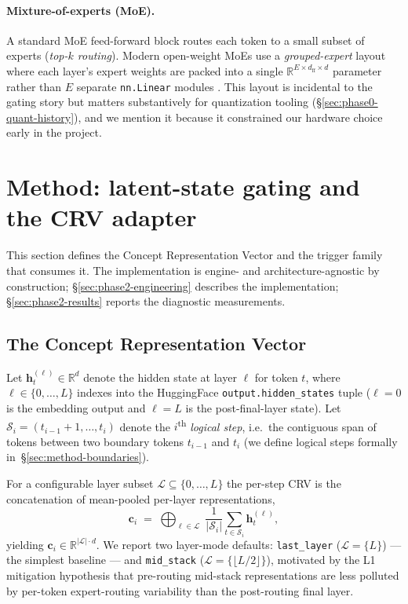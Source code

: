 \documentclass[11pt,letterpaper]{article}
\begin{document}
\paragraph{Mixture-of-experts (MoE).}
A standard MoE feed-forward block routes each token to a small subset
of experts (\emph{top-$k$ routing}). Modern open-weight MoEs use a
\emph{grouped-expert} layout where each layer's expert weights are
packed into a single $\mathbb{R}^{E \times d_\mathrm{ff} \times d}$
parameter rather than $E$ separate \texttt{nn.Linear} modules
\citep{TODO:qwen3-grouped-experts}. This layout is incidental to the
gating story but matters substantively for quantization tooling
(\S\ref{sec:phase0-quant-history}), and we mention it because it
constrained our hardware choice early in the project.

\section{Method: latent-state gating and the CRV adapter}
\label{sec:method}

This section defines the Concept Representation Vector and the
trigger family that consumes it. The implementation is engine- and
architecture-agnostic by construction; \S\ref{sec:phase2-engineering}
describes the implementation; \S\ref{sec:phase2-results} reports the
diagnostic measurements.

\subsection{The Concept Representation Vector}
\label{sec:method-crv}

Let $\mathbf{h}^{(\ell)}_t \in \mathbb{R}^d$ denote the hidden state at
layer $\ell$ for token $t$, where $\ell \in \{0, \ldots, L\}$ indexes
into the HuggingFace \texttt{output.hidden\_states} tuple ($\ell = 0$ is
the embedding output and $\ell = L$ is the post-final-layer state). Let
$\mathcal{S}_i = (t_{i-1}+1, \ldots, t_i)$ denote the $i$\textsuperscript{th}
\emph{logical step}, i.e.~the contiguous span of tokens between two
boundary tokens $t_{i-1}$ and $t_i$ (we define logical steps formally
in~\S\ref{sec:method-boundaries}).

For a configurable layer subset $\mathcal{L} \subseteq \{0, \ldots, L\}$
the per-step CRV is the concatenation of mean-pooled per-layer
representations,
\begin{equation}
\mathbf{c}_i \;=\; \bigoplus_{\ell \in \mathcal{L}}
\;\frac{1}{|\mathcal{S}_i|}
\sum_{t \in \mathcal{S}_i}
\mathbf{h}^{(\ell)}_t,
\label{eq:crv}
\end{equation}
yielding $\mathbf{c}_i \in \mathbb{R}^{|\mathcal{L}| \cdot d}$.
We report two layer-mode defaults: \texttt{last\_layer}
($\mathcal{L} = \{L\}$) — the simplest baseline — and
\texttt{mid\_stack} ($\mathcal{L} = \{\lfloor L/2\rfloor\}$), motivated
by the L1 mitigation hypothesis that pre-routing mid-stack
representations are less polluted by per-token expert-routing
variability than the post-routing final layer.
\end{document}
